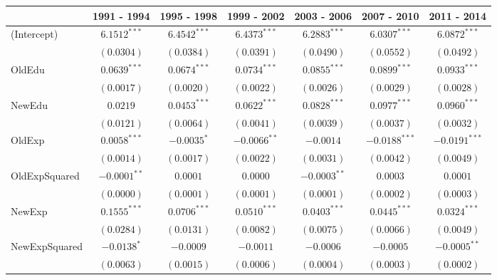 
\begin{table}
\begin{center}
\begin{small}
\begin{tabular}{l c c c c c c }
\hline
 & 1991 - 1994 & 1995 - 1998 & 1999 - 2002 & 2003 - 2006 & 2007 - 2010 & 2011 - 2014 \\
\hline
(Intercept)     & $6.1512^{***}$  & $6.4542^{***}$  & $6.4373^{***}$  & $6.2883^{***}$  & $6.0307^{***}$  & $6.0872^{***}$  \\
                & $(0.0304)$      & $(0.0384)$      & $(0.0391)$      & $(0.0490)$      & $(0.0552)$      & $(0.0492)$      \\
OldEdu          & $0.0639^{***}$  & $0.0674^{***}$  & $0.0734^{***}$  & $0.0855^{***}$  & $0.0899^{***}$  & $0.0933^{***}$  \\
                & $(0.0017)$      & $(0.0020)$      & $(0.0022)$      & $(0.0026)$      & $(0.0029)$      & $(0.0028)$      \\
NewEdu          & $0.0219$        & $0.0453^{***}$  & $0.0622^{***}$  & $0.0828^{***}$  & $0.0977^{***}$  & $0.0960^{***}$  \\
                & $(0.0121)$      & $(0.0064)$      & $(0.0041)$      & $(0.0039)$      & $(0.0037)$      & $(0.0032)$      \\
OldExp          & $0.0058^{***}$  & $-0.0035^{*}$   & $-0.0066^{**}$  & $-0.0014$       & $-0.0188^{***}$ & $-0.0191^{***}$ \\
                & $(0.0014)$      & $(0.0017)$      & $(0.0022)$      & $(0.0031)$      & $(0.0042)$      & $(0.0049)$      \\
OldExpSquared   & $-0.0001^{**}$  & $0.0001$        & $0.0000$        & $-0.0003^{**}$  & $0.0003$        & $0.0001$        \\
                & $(0.0000)$      & $(0.0001)$      & $(0.0001)$      & $(0.0001)$      & $(0.0002)$      & $(0.0003)$      \\
NewExp          & $0.1555^{***}$  & $0.0706^{***}$  & $0.0510^{***}$  & $0.0403^{***}$  & $0.0445^{***}$  & $0.0324^{***}$  \\
                & $(0.0284)$      & $(0.0131)$      & $(0.0082)$      & $(0.0075)$      & $(0.0066)$      & $(0.0049)$      \\
NewExpSquared   & $-0.0138^{*}$   & $-0.0009$       & $-0.0011$       & $-0.0006$       & $-0.0005$       & $-0.0005^{**}$  \\
                & $(0.0063)$      & $(0.0015)$      & $(0.0006)$      & $(0.0004)$      & $(0.0003)$      & $(0.0002)$      \\

\end{tabular}
\end{small}
\end{center}
\end{table}
